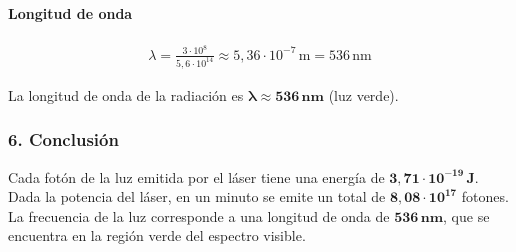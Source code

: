 \paragraph*{Longitud de onda}
\begin{gather}
    \lambda = \frac{3\cdot10^8}{5,6\cdot10^{14}} \approx 5,36 \cdot 10^{-7} \, \text{m} = 536 \, \text{nm}
\end{gather}
\begin{cajaresultado}
    La longitud de onda de la radiación es $\boldsymbol{\lambda \approx 536 \, nm}$ (luz verde).
\end{cajaresultado}

\subsubsection*{6. Conclusión}
\begin{cajaconclusion}
    Cada fotón de la luz emitida por el láser tiene una energía de $\mathbf{3,71 \cdot 10^{-19} \, J}$. Dada la potencia del láser, en un minuto se emite un total de $\mathbf{8,08 \cdot 10^{17}}$ fotones. La frecuencia de la luz corresponde a una longitud de onda de $\mathbf{536 \, nm}$, que se encuentra en la región verde del espectro visible.
\end{cajaconclusion}

\newpage
